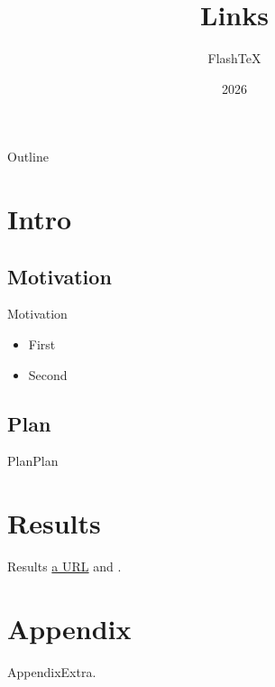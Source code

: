 \documentclass{beamer}
\title{Links}\author{FlashTeX}\institute{Lab}\date{2026}
\begin{document}
\begin{frame}\titlepage\end{frame}
\begin{frame}{Outline}\tableofcontents\end{frame}
\section{Intro}
\subsection{Motivation}
\begin{frame}[label=mot]{Motivation}
\begin{itemize}
\item<1-> First \hyperlink{res}{}
\item<2-> Second \hyperlink{app}{}
\end{itemize}
\end{frame}
\subsection{Plan}
\begin{frame}{Plan}\hypertarget<2>{plan}{Plan} \end{frame}
\section{Results}
\begin{frame}[label=res]{Results}
\href{https://example.com}{a URL} and \hyperlink{mot}{}.
\end{frame}
\appendix
\section{Appendix}
\begin{frame}[label=app]{Appendix}Extra.\end{frame}
\end{document}
